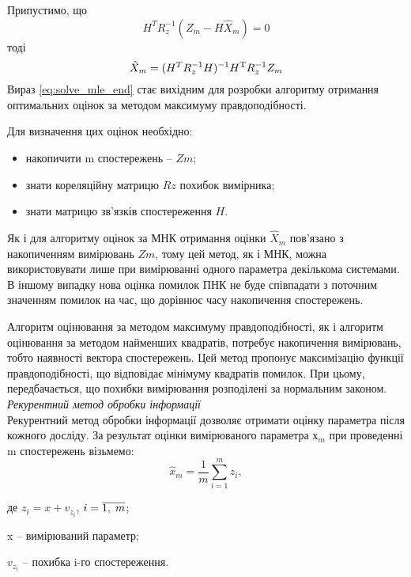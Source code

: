 Припустимо, що      
\[ H ^{T} R_{z}^{-1} (Z_{m} -H\hat{X}_{m} )=0 \]
тоді   
\begin{equation}
\hat{X }_{m} =(H^{T} R_{z}^{-1} H)^{-1} H^{{\rm T}} R_{z}^{-1} Z_{m} 
\label{eq:solve_mle_end}
\end{equation}
Вираз \eqref{eq:solve_mle_end} стає вихідним для розробки алгоритму отримання оптимальних 
оцінок  за методом максимуму правдоподібності.

Для визначення цих оцінок необхідно:
\begin{itemize}
\item накопичити m  спостережень -- $Zm$;
\item знати кореляційну матрицю $Rz$ похибок вимірника;
\item знати матрицю зв'язків спостереження $H$.
\end{itemize}

Як і для алгоритму оцінок за МНК отримання оцінки $\hat{X}_{m} $  пов'язано 
з накопиченням вимірювань $Zm$, тому цей метод, як і МНК, можна використовувати 
лише при вимірюванні одного параметра декількома системами. В іншому випадку нова 
оцінка помилок ПНК не буде співпадати з поточним значенням помилок на час, що дорівнює 
часу накопичення спостережень.

Алгоритм оцінювання за методом максимуму правдоподібності, як і алгоритм оцінювання 
за методом найменших квадратів, потребує накопичення вимірювань, тобто наявності 
вектора спостережень. Цей метод пропонує максимізацію функції правдоподібності, що 
відповідає мінімуму квадратів помилок. При цьому, передбачається, що похибки вимірювання 
розподілені за нормальним законом.\\

\textit{Рекурентний метод обробки інформації } \\

Рекурентний метод обробки інформації дозволяє отримати оцінку параметра після кожного 
досліду. За результат оцінки вимірюваного параметра $х_m$ при проведенні m спостережень 
візьмемо:          
\[ \hat{x}_{m} =\frac{1}{m} \sum _{i=1}^{m}z_{i},\]
\begin{ESKDexplanation}
\item де $z_{i} =x+v_{z_{i}}$, $i=\overline{1,{\rm \; }m}$; 
\item x -- вимірюваний параметр; 
\item $v_{z_{i}}$ -- похибка i-го спостереження.
\end{ESKDexplanation}

